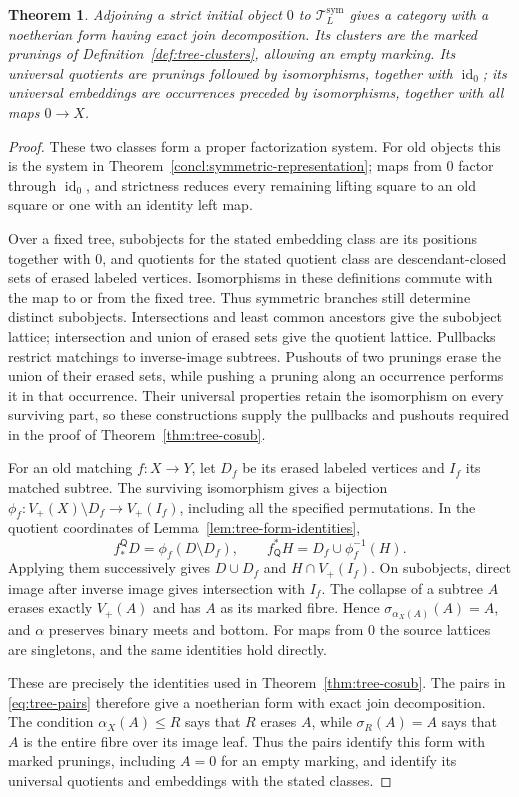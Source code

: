 \documentclass[11pt,a4paper]{article}
\theoremstyle{plain}
\newtheorem{theorem}{Theorem}[section]
\theoremstyle{definition}
\theoremstyle{remark}
\newcommand{\id}{\operatorname{id}}
\begin{document}
\begin{theorem}\label{concl:symmetric-form}
Adjoining a strict initial object $0$ to
$\mathcal T_L^{\mathrm{sym}}$ gives a category with a noetherian
form having exact join decomposition. Its clusters are the marked
prunings of Definition~\ref{def:tree-clusters}, allowing an empty
marking. Its universal quotients are prunings followed by
isomorphisms, together with $\id_0$; its universal embeddings are
occurrences preceded by isomorphisms, together with all maps
$0\to X$.
\end{theorem}
\begin{proof}
These two classes form a proper factorization system. For old
objects this is the system in
Theorem~\ref{concl:symmetric-representation}; maps from $0$ factor
through $\id_0$, and strictness reduces every remaining lifting
square to an old square or one with an identity left map.

Over a fixed tree, subobjects for the stated embedding class
are its positions together with $0$, and quotients for the
stated quotient class are descendant-closed sets of erased
labeled vertices. Isomorphisms in these definitions commute
with the map to or from the fixed tree. Thus symmetric branches
still determine distinct subobjects. Intersections and least common ancestors give
the subobject lattice; intersection and union of erased sets give
the quotient lattice. Pullbacks restrict matchings to inverse-image
subtrees. Pushouts of two prunings erase the union of their erased
sets, while pushing a pruning along an occurrence performs it in
that occurrence. Their universal properties retain the isomorphism
on every surviving part, so these constructions supply the
pullbacks and pushouts required in the proof of
Theorem~\ref{thm:tree-cosub}.

For an old matching $f:X\to Y$, let $D_f$ be its erased labeled
vertices and $I_f$ its matched subtree. The surviving isomorphism
gives a bijection
$\phi_f:V_+(X)\setminus D_f\to V_+(I_f)$, including all the
specified permutations. In the quotient coordinates of
Lemma~\ref{lem:tree-form-identities},
\[
 f_*^{\mathsf Q}D=\phi_f(D\setminus D_f),\qquad
 f_{\mathsf Q}^*H=D_f\cup\phi_f^{-1}(H).
\]
Applying them successively gives $D\cup D_f$ and
$H\cap V_+(I_f)$. On subobjects, direct image after inverse image
gives intersection with $I_f$. The collapse of a subtree $A$ erases
exactly $V_+(A)$ and has $A$ as its marked fibre. Hence
$\sigma_{\alpha_X(A)}(A)=A$, and $\alpha$ preserves binary meets
and bottom. For maps from $0$ the source lattices are singletons,
and the same identities hold directly.

These are precisely the identities used in
Theorem~\ref{thm:tree-cosub}. The pairs in
\eqref{eq:tree-pairs} therefore give a noetherian form with exact
join decomposition. The condition $\alpha_X(A)\le R$ says that
$R$ erases $A$, while $\sigma_R(A)=A$ says that $A$ is the entire
fibre over its image leaf. Thus the pairs identify this form with
marked prunings, including $A=0$ for an empty marking, and identify
its universal quotients and embeddings with the stated classes.
\end{proof}
\end{document}

